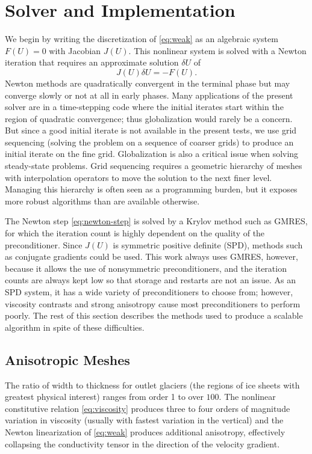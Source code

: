 \documentclass[final]{siamltex}
\begin{document}
\section{Solver and Implementation}\label{sec:solver}
We begin by writing the discretization of \eqref{eq:weak} as an algebraic system $F(U) = 0$ with
Jacobian $J(U)$.  This nonlinear system is solved with a Newton iteration that requires an
approximate solution $\delta U$ of
\begin{equation}\label{eq:newton-step}
  J(U)\delta U = -F(U) .
\end{equation}
Newton methods are quadratically convergent in the terminal phase but may converge slowly or
not at all in early phases.  Many applications of the present solver are in a time-stepping code
where the initial iterates start within the region of quadratic convergence; thus globalization
would rarely be a concern. But since a good initial iterate is not available in the present tests,
we use grid sequencing (solving the problem on a sequence of coarser grids) to produce an initial
iterate on the fine grid.
Globalization is also a critical issue when solving steady-state problems.
Grid sequencing requires a geometric hierarchy of meshes with interpolation operators to move the solution to the next finer level.
Managing this hierarchy is often seen as a programming burden, but it exposes more robust algorithms than are available otherwise.

The Newton step \eqref{eq:newton-step} is solved by a Krylov method such as GMRES, for which the iteration count is highly dependent on the quality of the preconditioner.  Since $J(U)$ is symmetric positive definite (SPD), methods such as conjugate gradients could be used. This work always uses GMRES, however, because it allows the use of nonsymmetric preconditioners, and the iteration counts are always kept low so that storage and restarts are not an issue.  As an SPD system, it has a wide variety of preconditioners to choose from; however, viscosity contrasts and strong anisotropy cause most preconditioners to perform poorly.  The rest of this section describes the methods used to produce a scalable algorithm in spite of these difficulties.

\subsection{Anisotropic Meshes}
The ratio of width to thickness for outlet glaciers (the regions of ice sheets with greatest physical interest) ranges from order 1 to over $100$.  The nonlinear constitutive relation \eqref{eq:viscosity} produces three to four orders of magnitude variation in viscosity (usually with fastest variation in the vertical) and the Newton linearization of \eqref{eq:weak} produces additional anisotropy, effectively collapsing the conductivity tensor in the direction of the velocity gradient.
\end{document}
